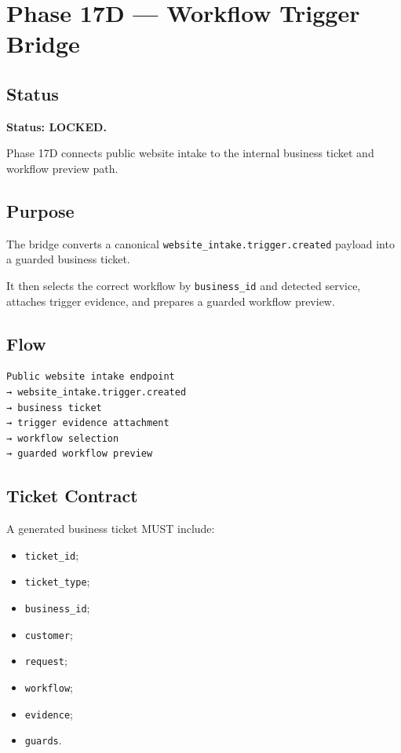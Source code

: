 \section{Phase 17D --- Workflow Trigger Bridge}
\label{sec:aion-phase17d-workflow-trigger-bridge}

\subsection{Status}

\textbf{Status: LOCKED.}

Phase 17D connects public website intake to the internal business ticket and workflow preview path.

\subsection{Purpose}

The bridge converts a canonical \texttt{website\_intake.trigger.created} payload into a guarded business ticket.

It then selects the correct workflow by \texttt{business\_id} and detected service, attaches trigger evidence, and prepares a guarded workflow preview.

\subsection{Flow}

\begin{verbatim}
Public website intake endpoint
→ website_intake.trigger.created
→ business ticket
→ trigger evidence attachment
→ workflow selection
→ guarded workflow preview
\end{verbatim}

\subsection{Ticket Contract}

A generated business ticket MUST include:

\begin{itemize}
  \item \texttt{ticket\_id};
  \item \texttt{ticket\_type};
  \item \texttt{business\_id};
  \item \texttt{customer};
  \item \texttt{request};
  \item \texttt{workflow};
  \item \texttt{evidence};
  \item \texttt{guards}.
\end{itemize}

